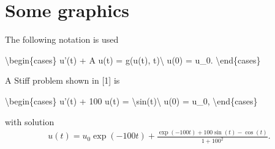 \documentclass[letterpaper,10pt,english]{jupyterBook}
\begin{document}
\section{Some graphics}
\label{\detokenize{appendix:some-graphics}}
\sphinxAtStartPar
The following notation is used

\sphinxAtStartPar
\textbackslash{}begin\{cases\}
u’(t) + A u(t) = g(u(t), t)\textbackslash{}
u(0) = u\_0.
\textbackslash{}end\{cases\}

\sphinxAtStartPar
A Stiff problem shown in {[}1{]} is

\sphinxAtStartPar
\textbackslash{}begin\{cases\}
u’(t) + 100 u(t) = \textbackslash{}sin(t)\textbackslash{}
u(0) = u\_0,
\textbackslash{}end\{cases\}

\sphinxAtStartPar
with solution
\begin{equation*}
\begin{split}
u(t) = u_0 \exp(-100t)+\frac{\exp(-100t)+100\sin(t)-\cos(t)}{1+100^2}.
\end{split}
\end{equation*}
\end{document}

